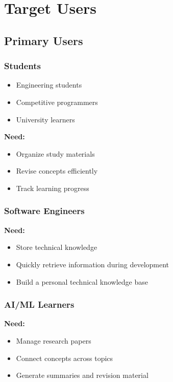 \documentclass[11pt]{article}
\begin{document}
\section{Target Users}

\subsection{Primary Users}

\subsubsection{Students}

\begin{itemize}[nosep]
    \item Engineering students
    \item Competitive programmers
    \item University learners
\end{itemize}

\textbf{Need:}
\begin{itemize}[nosep]
    \item Organize study materials
    \item Revise concepts efficiently
    \item Track learning progress
\end{itemize}

\subsubsection{Software Engineers}

\textbf{Need:}
\begin{itemize}[nosep]
    \item Store technical knowledge
    \item Quickly retrieve information during development
    \item Build a personal technical knowledge base
\end{itemize}

\subsubsection{AI/ML Learners}

\textbf{Need:}
\begin{itemize}[nosep]
    \item Manage research papers
    \item Connect concepts across topics
    \item Generate summaries and revision material
\end{itemize}
\end{document}
